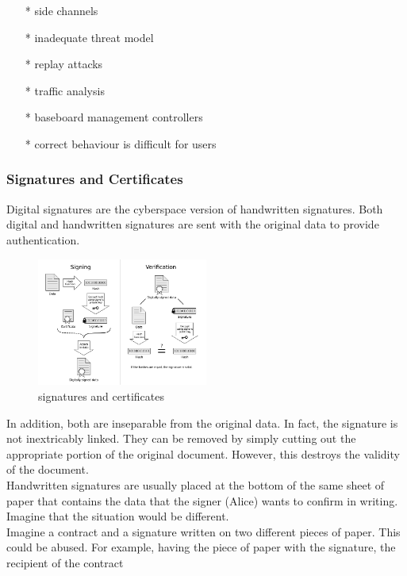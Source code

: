 \begin{enumerate}[]
    \item[*] side channels
    \item[*] inadequate threat model
    \item[*] replay attacks
    \item[*] traﬃc analysis
    \item[*] baseboard management controllers
    \item[*] correct behaviour is diﬃcult for users
    \end{enumerate}

\subsubsection{Signatures and Certiﬁcates}\cite{b38}
Digital signatures are the cyberspace version of handwritten signatures. Both digital and 
handwritten signatures are sent with the original data to provide authentication.
\begin{figure}[H] %
    \centering %
    \includegraphics[width=0.5\textwidth]{figures/signature.png} %
    \caption{signatures and certificates} %
    \label{Fig.2: Signatures and Certificates} %
\end{figure}
In addition, both are inseparable from the original data. In fact, the signature is not 
inextricably linked. They can be removed by simply cutting out the appropriate portion of 
the original document. However, this destroys the validity of the document.
\\
Handwritten signatures are usually placed at the bottom of the same sheet of paper that 
contains the data that the signer (Alice) wants to confirm in writing. Imagine that the 
situation would be different.
\\
Imagine a contract and a signature written on two different pieces of paper. This could 
be abused. For example, having the piece of paper with the signature, the recipient of the contract
